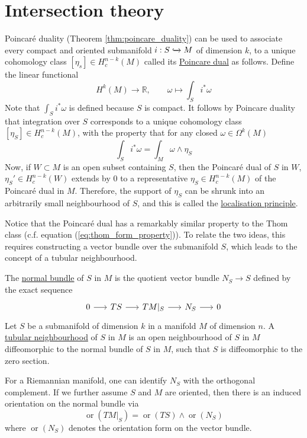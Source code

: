 \section{Intersection theory}
Poincar\'e duality (Theorem \ref{thm:poincare_duality}) can be used to associate 
every compact and oriented 
submanifold $i: S \xhookrightarrow{} M$ of dimension  $k$, 
to a unique cohomology class  $[\eta_s]\in H^{n-k}_c(M)$ called its
\underline{Poincare dual} as follows. Define the linear functional
\[
H^k(M) \to \mathbb{R}, \qquad 
\omega \mapsto \int_S i^*\omega
\] 
Note that $\int_S i^*\omega$ is defined because $S$ is compact. 
It follows by Poincare duality that integration over $S$ corresponds to a
unique cohomology class $[\eta_S]\in H^{n-k}_c(M)$, with the property that 
for any closed $\omega\in \Omega^k(M)$
\begin{equation} \label{eq:poincare_dual_property}
	\int_S i^*\omega = \int_M \omega \wedge \eta_S
\end{equation}
Now, if $W\subset M$ is an open subset containing $S$, then the Poincar\'e dual
of  $S$ in  $W$,  $\eta_S' \in H_c^{n-k}(W)$ extends by 0 to a representative 
$\eta_S\in H_c^{n-k}(M)$ of the Poincar\'e dual in $M$. 
Therefore, the support of $\eta_S$ can be shrunk into an arbitrarily small
neighbourhood of  $S$, and this is called the \underline{localisation
principle}. 

Notice that the Poincar\'e dual has a remarkably similar property to the 
Thom class (c.f. equation (\ref{eq:thom_form_property})). 
To relate the two ideas, this requires constructing a vector bundle over the
submanifold $S$, which leads to the concept of a tubular neighbourhood.
\begin{defn}
	The \underline{normal bundle} of $S$ in  $M$ is the quotient vector bundle
	$N_S\to S$ defined by the exact sequence 
	\[
	\begin{tikzcd}[column sep = 1.6em]
		0 \arrow[r] & TS \arrow[r] & TM|_S \arrow[r] 
						& N_S \arrow[r] & 0
	\end{tikzcd}
	\]
	Let $S$ be a submanifold of dimension  $k$ in a manifold  $M$ of dimension
	$n$. A \underline{tubular neighbourhood} of  $S$ in  $M$ is an open
	neighbourhood of  $S$ in  $M$ diffeomorphic to the normal bundle of $S$ in
	 $M$, such that  $S$ is diffeomorphic to the zero section.
\end{defn}
For a Riemannian manifold, one can identify $N_S$ with the orthogonal
complement. If we further assume $S$ and $M$ are oriented, then there is an
induced orientation on the normal bundle via 
\begin{equation} \label{eq:normal_orientation}
	\operatorname{or}(TM|_S) = \operatorname{or}(TS)\wedge \operatorname{or}(N_S)
\end{equation}
where $\operatorname{or}(N_S)$ denotes the orientation form on the vector bundle. 

